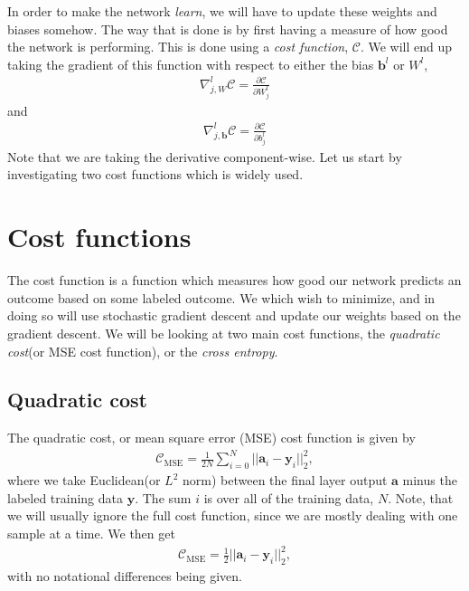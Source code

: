 \documentclass[a4paper,10pt]{article}
\begin{document}
In order to make the network \textit{learn}, we will have to update these weights and biases somehow. The way that is done is by first having a measure of how good the network is performing. This is done using a \textit{cost function}, $\mathcal{C}$. We will end up taking the gradient of this function with respect to either the bias $\bm{b}^l$ or $W^l$,
\begin{align*}
    \nabla_{j,W}^l \mathcal{C} = \frac{\partial \mathcal{C}}{\partial W^l_j}
\end{align*}
and
\begin{align*}
    \nabla^l_{j,\bm{b}} \mathcal{C} = \frac{\partial \mathcal{C}}{\partial b^l_j}
\end{align*}
Note that we are taking the derivative component-wise. Let us start by investigating two cost functions which is widely used.

\section{Cost functions}
The cost function is a function which measures how good our network predicts an outcome based on some labeled outcome. We which wish to minimize, and in doing so will use stochastic gradient descent and update our weights based on the gradient descent. We will be looking at two main cost functions, the \textit{quadratic cost}(or MSE cost function), or the \textit{cross entropy}.

\subsection{Quadratic cost}
The quadratic cost, or mean square error (MSE) cost function is given by
\begin{align}
    \mathcal{C}_\mathrm{MSE} = \frac{1}{2N} \sum_{i=0}^N ||\bm{a}_i - \bm{y}_i||^2_2,
    \label{eq:full-mse-cost}
\end{align}
where we take Euclidean(or $L^2$ norm) between the final layer output $\bm{a}$ minus the labeled training data $\bm{y}$. The sum $i$ is over all of the training data, $N$. Note, that we will usually ignore the full cost function, since we are mostly dealing with one sample at a time. We then get
\begin{align}
    \mathcal{C}_\mathrm{MSE} = \frac{1}{2} ||\bm{a}_i - \bm{y}_i||^2_2,
    \label{eq:mse-cost}
\end{align}
with no notational differences being given.
\end{document}
